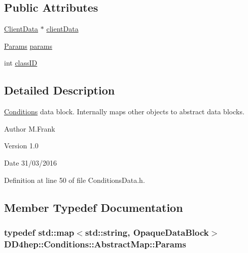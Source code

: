 \subsection*{Public Attributes}
\begin{DoxyCompactItemize}
\item 
\hyperlink{struct_d_d4hep_1_1_conditions_1_1_client_data}{ClientData} $\ast$ \hyperlink{class_d_d4hep_1_1_conditions_1_1_abstract_map_a4255c1d1d93eb1ecfee921ed752a54da}{clientData}
\item 
\hyperlink{class_d_d4hep_1_1_conditions_1_1_abstract_map_a0a7595cac22aa8ddc6f6900d7883c2fc}{Params} \hyperlink{class_d_d4hep_1_1_conditions_1_1_abstract_map_ae2e1b9489f65c31a0bb1c1851686cca4}{params}
\item 
int \hyperlink{class_d_d4hep_1_1_conditions_1_1_abstract_map_a33a343986fada98f91b7118368fa7248}{classID}
\end{DoxyCompactItemize}


\subsection{Detailed Description}
\hyperlink{namespace_d_d4hep_1_1_conditions}{Conditions} data block. Internally maps other objects to abstract data blocks. \begin{DoxyAuthor}{Author}
M.Frank 
\end{DoxyAuthor}
\begin{DoxyVersion}{Version}
1.0 
\end{DoxyVersion}
\begin{DoxyDate}{Date}
31/03/2016 
\end{DoxyDate}


Definition at line 50 of file ConditionsData.h.

\subsection{Member Typedef Documentation}
\hypertarget{class_d_d4hep_1_1_conditions_1_1_abstract_map_a0a7595cac22aa8ddc6f6900d7883c2fc}{
\subsubsection[{Params}]{\setlength{\rightskip}{0pt plus 5cm}typedef std::map$<$std::string, {\bf OpaqueDataBlock}$>$ {\bf DD4hep::Conditions::AbstractMap::Params}}}
\label{class_d_d4hep_1_1_conditions_1_1_abstract_map_a0a7595cac22aa8ddc6f6900d7883c2fc}


